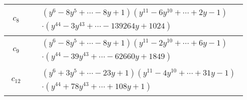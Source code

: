 \documentclass[1p]{elsarticle_modified}
\theoremstyle{definition}
\begin{document}
\begin{tabular}{m{50pt}|m{274pt}}
\hline $$\begin{aligned}c_{8}\end{aligned}$$&$\begin{aligned}
&(y^6-8 y^5+\cdots-8 y+1)(y^{11}-6 y^{10}+\cdots+2 y-1)\\
&\cdot(y^{44}-3 y^{43}+\cdots-139264 y+1024)
\end{aligned}$\\
\hline $$\begin{aligned}c_{9}\end{aligned}$$&$\begin{aligned}
&(y^6-8 y^5+\cdots-8 y+1)(y^{11}-2 y^{10}+\cdots+6 y-1)\\
&\cdot(y^{44}-39 y^{43}+\cdots-62660 y+1849)
\end{aligned}$\\
\hline $$\begin{aligned}c_{12}\end{aligned}$$&$\begin{aligned}
&(y^6+3 y^5+\cdots-23 y+1)(y^{11}-4 y^{10}+\cdots+31 y-1)\\
&\cdot(y^{44}+78 y^{43}+\cdots+108 y+1)
\end{aligned}$\\
\hline
\end{tabular}
\vskip 2pc
\end{document}
